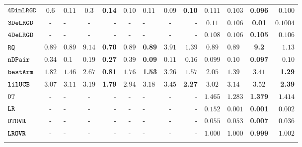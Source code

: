 {\begin {table}[t]
\begin{center}
{\begin{tabular}{|| >{\tiny}l || c | l | c | r || c | l | c | r || c | l | c | r || }
         $  \mathtt{ 4DimLRGD }$  & $0.6$   & $0.11$ & $0.3 $ & \textbf{0.14} & $0.10$ & $0.11$ & $0.09$ & \textbf{0.10} & $0.111$   & $0.103$ & \textbf{0.096} & $0.100$  \\
         \hhline{||-||---||-||----||----||}
         $  \mathtt{ 3DeLRGD }$ & -  & - & - & - & -  & - & - & -  & $0.11$   & $0.106$ & \textbf{0.01} & $0.1004$  \\
         \hhline{||-||---||-||----||----||}
         $  \mathtt{ 4DeLRGD }$  & -  & - & - & - & -  & - & - & -  & $0.108$   & $0.106$ & \textbf{0.105} & $0.106$   \\
         \hhline{||-||---||-||----||----||}
         $\mathtt{RQ}$~\cite{Jamieson2015TheAO} & $0.89$  & $0.89$ & $9.14$ & \textbf{0.70} & $0.89$  & \textbf{0.89} & $3.91$ & $1.39$  & $0.89$   & $0.89$ & \textbf{9.2} & $1.13$   \\
         \hhline{||-||---||-||----||----||}
         $\mathtt{nDPair}$~\cite{Jamieson2015TheAO} & $0.34$  & $0.1$ & $0.19$ & \textbf{0.27}  & $0.39$  & \textbf{0.09} & $0.11$ & $0.16$  & $0.099$   & $0.10$ & \textbf{0.097} & $0.10$   \\
         \hhline{||-||---||-||----||----||}
         $\mathtt{bestArm}$~\cite{Jamieson2015TheAO} & $1.82$  & $1.46$ & $2.67$ & \textbf{0.81}  & $1.76$  & \textbf{1.53} & $3.26$ & $1.57$  & $ 2.05$   & $ 1.39$ & {{$3.41$}} & \textbf{1.29}  \\
         \hhline{||-||---||-||----||----||}
         $\mathtt{lilUCB}$~\cite{Jamieson2015TheAO}& $3.07$  & $3.11$ & $3.19$ & \textbf{1.79} & $2.94$ & $3.18$ & $3.45$ & \textbf{2.27}  & $3.02$   & $ 3.14$ & {$3.52$} & \textbf{2.39}   \\
         \hhline{||-||---||-||----||----||}
         $\mathtt{DT}$ & -  & - & - & - & -  & - & - & - & $ 1.465$  & $ 1.283$ & \textbf{1.379 } & {$1.414$}   \\
         \hhline{||-||---||-||----||----||}
         $\mathtt{LR}$ & -  & - & - & - & -  & - & - & -  & $ 0.152$  &  $ 0.001$ & {\textbf{0.001}} & {$0.002$}   \\
        \hhline{||-||---||-||----||----||}
        $\mathtt{DTOVR}$ & -  & - & - & -  & -  & - & - & - &  $0.055$ & $0.053$  &  {\textbf{0.007}} & $0.036$  \\
        \hhline{||-||---||-||----||----||}
        $\mathtt{LROVR}$  & -  & - & - & -  & -  & - & - & -  &  $ 1.000  $  &  $ 1.000 $ & {\textbf{ 0.999}} & $ 1.002 $  \\
        \hhline{|:t============= t:|}
\end{tabular}
}
\end{center}
\vspace{-0.5cm}
\end{table}
}